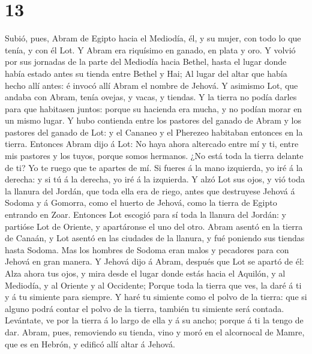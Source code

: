 \hypertarget{section-12}{%
\section{13}\label{section-12}}

 Subió, pues, Abram de Egipto hacia el Mediodía, él, y su
mujer, con todo lo que tenía, y con él Lot.  Y Abram era
riquísimo en ganado, en plata y oro.  Y volvió por sus
jornadas de la parte del Mediodía hacia Bethel, hasta el lugar donde
había estado antes su tienda entre Bethel y Hai;  Al lugar
del altar que había hecho allí antes: é invocó allí Abram el nombre de
Jehová.  Y asimismo Lot, que andaba con Abram, tenía
ovejas, y vacas, y tiendas.  Y la tierra no podía darles
para que habitasen juntos: porque su hacienda era mucha, y no podían
morar en un mismo lugar.  Y hubo contienda entre los
pastores del ganado de Abram y los pastores del ganado de Lot: y el
Cananeo y el Pherezeo habitaban entonces en la tierra. 
Entonces Abram dijo á Lot: No haya ahora altercado entre mí y ti, entre
mis pastores y los tuyos, porque somos hermanos.  ¿No está
toda la tierra delante de ti? Yo te ruego que te apartes de mí. Si
fueres á la mano izquierda, yo iré á la derecha: y si tú á la derecha,
yo iré á la izquierda.  Y alzó Lot sus ojos, y vió toda
la llanura del Jordán, que toda ella era de riego, antes que destruyese
Jehová á Sodoma y á Gomorra, como el huerto de Jehová, como la tierra de
Egipto entrando en Zoar.  Entonces Lot escogió para sí
toda la llanura del Jordán: y partióse Lot de Oriente, y apartáronse el
uno del otro.  Abram asentó en la tierra de Canaán, y Lot
asentó en las ciudades de la llanura, y fué poniendo sus tiendas hasta
Sodoma.  Mas los hombres de Sodoma eran malos y pecadores
para con Jehová en gran manera.  Y Jehová dijo á Abram,
después que Lot se apartó de él: Alza ahora tus ojos, y mira desde el
lugar donde estás hacia el Aquilón, y al Mediodía, y al Oriente y al
Occidente;  Porque toda la tierra que ves, la daré á ti y
á tu simiente para siempre.  Y haré tu simiente como el
polvo de la tierra: que si alguno podrá contar el polvo de la tierra,
también tu simiente será contada.  Levántate, ve por la
tierra á lo largo de ella y á su ancho; porque á ti la tengo de dar.
 Abram, pues, removiendo su tienda, vino y moró en el
alcornocal de Mamre, que es en Hebrón, y edificó allí altar á Jehová.

